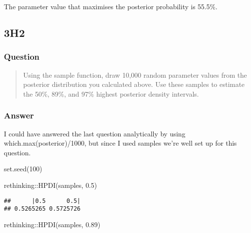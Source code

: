 \documentclass[
]{book}
\newenvironment{Shaded}{\begin{snugshade}}{\end{snugshade}}
\newcommand{\DecValTok}[1]{\textcolor[rgb]{0.00,0.00,0.81}{#1}}
\newcommand{\FloatTok}[1]{\textcolor[rgb]{0.00,0.00,0.81}{#1}}
\newcommand{\FunctionTok}[1]{\textcolor[rgb]{0.00,0.00,0.00}{#1}}
\newcommand{\NormalTok}[1]{#1}
\newcommand{\SpecialCharTok}[1]{\textcolor[rgb]{0.00,0.00,0.00}{#1}}
\begin{document}
The parameter value that maximises the posterior probability is 55.5\%.

\hypertarget{h2-1}{%
\subsection*{3H2}\label{h2-1}}

\hypertarget{question-29}{%
\subsubsection*{Question}\label{question-29}}

\begin{quote}
Using the sample function, draw 10,000 random parameter values from the posterior distribution you calculated above. Use these samples to estimate the 50\%, 89\%, and 97\% highest posterior density intervals.
\end{quote}

\hypertarget{answer-29}{%
\subsubsection*{Answer}\label{answer-29}}

I could have answered the last question analytically by using which.max(posterior)/1000, but since I used samples we're well set up for this question.

\begin{Shaded}
\begin{Highlighting}[]
\FunctionTok{set.seed}\NormalTok{(}\DecValTok{100}\NormalTok{)}

\NormalTok{rethinking}\SpecialCharTok{::}\FunctionTok{HPDI}\NormalTok{(samples, }\FloatTok{0.5}\NormalTok{)}
\end{Highlighting}
\end{Shaded}

\begin{verbatim}
##      |0.5      0.5| 
## 0.5265265 0.5725726
\end{verbatim}

\begin{Shaded}
\begin{Highlighting}[]
\NormalTok{rethinking}\SpecialCharTok{::}\FunctionTok{HPDI}\NormalTok{(samples, }\FloatTok{0.89}\NormalTok{)}
\end{Highlighting}
\end{Shaded}
\end{document}
